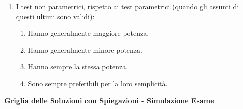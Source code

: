\documentclass[12pt, a4paper]{article}
\begin{document}
\begin{enumerate}[resume]
    \item I test non parametrici, rispetto ai test parametrici (quando gli assunti di questi ultimi sono validi):
    \begin{enumerate}
        \item Hanno generalmente maggiore potenza.
        \item Hanno generalmente minore potenza.
        \item Hanno sempre la stessa potenza.
        \item Sono sempre preferibili per la loro semplicità.
    \end{enumerate}
    \vspace{0.3cm}
\end{enumerate}

\newpage
\begin{center}
    \Large\textbf{Griglia delle Soluzioni con Spiegazioni - Simulazione Esame}
\end{center}
\vspace{1cm}
\end{document}
